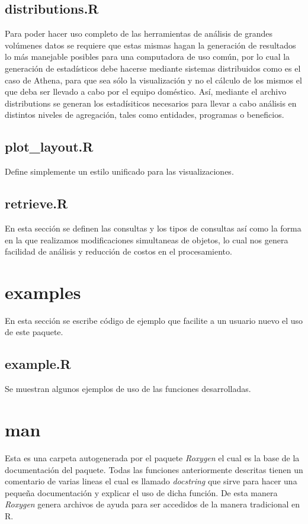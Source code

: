 \subsection{distributions.R}
Para poder hacer uso completo de las herramientas de análisis de grandes volúmenes datos se requiere que estas mismas hagan la generación de resultados lo más manejable posibles para una computadora de uso común, por lo cual la generación de estadísticos debe hacerse mediante sistemas distribuidos como es el caso de Athena, para que sea sólo la visualización y no el cálculo de los mismos el que deba ser llevado a cabo por el equipo doméstico. Así, mediante el archivo distributions se generan los estadísiticos necesarios para llevar a cabo análisis en distintos niveles de agregación, tales como entidades, programas o beneficios.

\subsection{plot\_layout.R}
Define simplemente un estilo unificado para las visualizaciones.

\subsection{retrieve.R}
En esta sección se definen las consultas y los tipos de consultas así como la forma en la que realizamos modificaciones simultaneas de objetos, lo cual nos genera facilidad de análisis y reducción de costos en el procesamiento.

\section{examples}
En esta sección se escribe código de ejemplo que facilite a un usuario nuevo el uso de este paquete.
\subsection{example.R}
Se muestran algunos ejemplos de uso de las funciones desarrolladas.

\section{man}
Esta es una carpeta autogenerada por el paquete \textit{Roxygen} el cual es la base de la documentación del paquete. Todas las funciones anteriormente descritas tienen un comentario de varias lineas el cual es llamado \textit{docstring} que sirve para hacer una pequeña documentación y explicar el uso de dicha función. De esta manera \textit{Roxygen} genera archivos de ayuda para ser accedidos de la manera tradicional en R.
